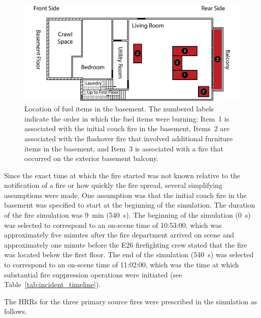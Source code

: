 \documentclass[12pt,oneside]{book}
\begin{document}
\begin{figure}[!ht]
\includegraphics[width=5.5in]{../Figures/Plan_Basement_Fuels}
\caption[Location of fuel items in the basement.]
{Location of fuel items in the basement. The numbered labels indicate the order in which the fuel items were burning: Item~1 is associated with the initial couch fire in the basement, Items~2 are associated with the flashover fire that involved additional furniture items in the basement, and Item~3 is associated with a fire that occurred on the exterior basement balcony.}
\label{fig:fuel_placement}
\end{figure}


\clearpage


Since the exact time at which the fire started was not known relative to the notification of a fire or how quickly the fire spread, several simplifying assumptions were made. One assumption was that the initial couch fire in the basement was specified to start at the beginning of the simulation. The duration of the fire simulation was 9~min (540~s). The beginning of the simulation (0~s) was selected to correspond to an on-scene time of 10:53:00, which was approximately five minutes after the fire department arrived on scene and approximately one minute before the E26 firefighting crew stated that the fire was located below the first floor. The end of the simulation (540~s) was selected to correspond to an on-scene time of 11:02:00, which was the time at which substantial fire suppression operations were initiated (see Table~\ref{tab:incident_timeline}).

The HRRs for the three primary source fires were prescribed in the simulation as follows.
\end{document}
